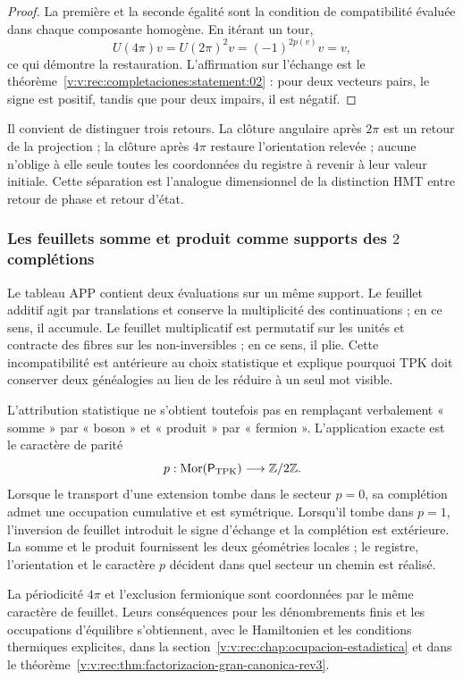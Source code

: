 \begin{proof}
La première et la seconde égalité sont la condition de compatibilité évaluée
dans chaque composante homogène. En itérant un tour,
\[
 U(4\pi)v=U(2\pi)^2v=(-1)^{2p(v)}v=v,
\]
ce qui démontre la restauration. L’affirmation sur l’échange est le
théorème~\ref{v:v:rec:completaciones:statement:02} : pour deux vecteurs
pairs, le signe est positif, tandis que pour deux impairs, il est négatif.
\end{proof}

Il convient de distinguer trois retours. La clôture angulaire après \(2\pi\) est un
retour de la projection ; la clôture après \(4\pi\) restaure l’orientation
relevée ; aucune n’oblige à elle seule toutes les coordonnées du registre à
revenir à leur valeur initiale. Cette séparation est l’analogue dimensionnel de la
distinction HMT entre retour de phase et retour d’état.

\subsubsection{Les feuillets somme et produit comme supports des \(2\) complétions}
\label{v:v:rec:completaciones:section:06}

Le tableau APP contient deux évaluations sur un même support. Le feuillet
additif agit par translations et conserve la multiplicité des
continuations ; en ce sens, il accumule. Le feuillet multiplicatif est
permutatif sur les unités et contracte des fibres sur les non-inversibles ; en
ce sens, il plie. Cette incompatibilité est antérieure au choix
statistique et explique pourquoi TPK doit conserver deux généalogies au lieu de
les réduire à un seul mot visible.

L’attribution statistique ne s’obtient toutefois pas en remplaçant
verbalement « somme » par « boson » et « produit » par « fermion ». L’application exacte est
le caractère de parité
\[
 p:\operatorname{Mor}(\mathsf P_{\rm TPK})\longrightarrow\mathbb Z/2\mathbb Z.
\]
Lorsque le transport d’une extension tombe dans le secteur \(p=0\), sa
complétion admet une occupation cumulative et est symétrique. Lorsqu’il tombe dans
\(p=1\), l’inversion de feuillet introduit le signe d’échange et la
complétion est extérieure. La somme et le produit fournissent les deux
géométries locales ; le registre, l’orientation et le caractère \(p\) décident dans
quel secteur un chemin est réalisé.

La périodicité \(4\pi\) et l’exclusion fermionique sont coordonnées par
le même caractère de feuillet. Leurs conséquences pour les dénombrements finis et
les occupations d’équilibre s’obtiennent, avec le Hamiltonien et les
conditions thermiques explicites, dans la
section~\ref{v:v:rec:chap:ocupacion-estadistica} et dans le
théorème~\ref{v:v:rec:thm:factorizacion-gran-canonica-rev3}.

